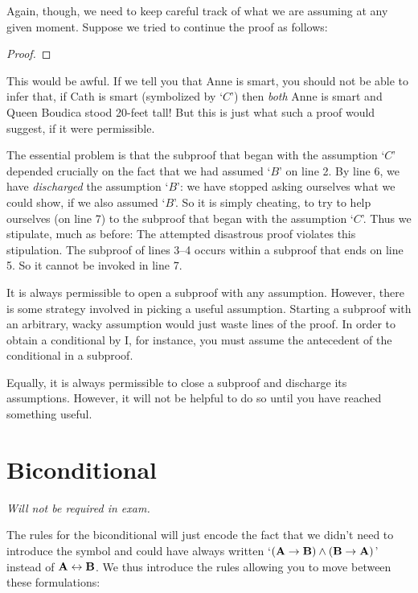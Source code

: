 Again, though, we need to keep careful track of what we are assuming at any given moment. Suppose we tried to continue the proof as follows:
\begin{proof}
\open
	\open
	\close
\close
{}
\end{proof}
This would be awful. If we tell you that Anne is smart, you should not be able to infer that, if Cath is smart (symbolized by `$C$') then \emph{both} Anne is smart and Queen Boudica stood 20-feet tall! But this is just what such a proof would suggest, if it were permissible.

The essential problem is that the subproof that began with the assumption `$C$' depended crucially on the fact that we had assumed `$B$' on line 2. By line 6, we have \emph{discharged} the assumption `$B$': we have stopped asking ourselves what we could show, if we also assumed `$B$'. So it is simply cheating, to try to help ourselves (on line 7) to the subproof that began with the assumption `$C$'. Thus we stipulate, much as before:
The attempted disastrous proof violates this stipulation. The subproof of lines 3--4 occurs within a subproof that ends on line 5. So it cannot be invoked in line 7.

It is always permissible to open a subproof with any assumption. However, there is some strategy involved in picking a useful assumption. Starting a subproof with an arbitrary, wacky assumption would just waste lines of the proof. In order to obtain a conditional by {\eif}I, for instance, you must assume the antecedent of the conditional in a subproof. 

Equally, it is always permissible to close a subproof and discharge its assumptions. However, it will not be helpful to do so until you have reached something useful.


\section{Biconditional}
\emph{Will not be required in exam.}

The rules for the biconditional will just encode the fact that we didn't need to introduce the symbol and could have always written `$(\mathbf{A}\rightarrow\mathbf{B})\wedge(\mathbf{B}\rightarrow\mathbf{A})$' instead of $\mathbf{A}\leftrightarrow\mathbf{B}$. We thus introduce the rules allowing you to move between these formulations: 

